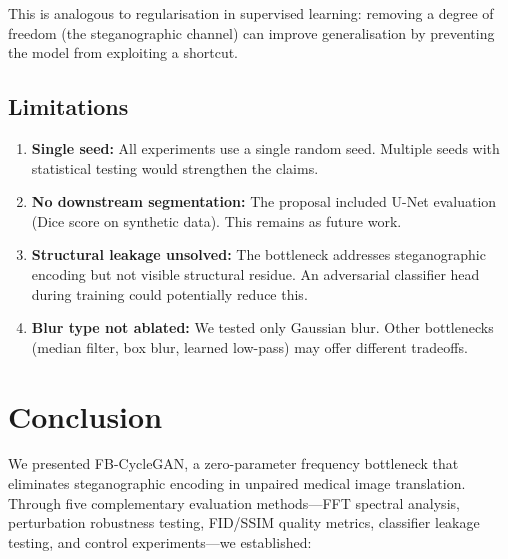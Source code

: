 \documentclass[11pt,a4paper]{article}
\theoremstyle{definition}
\begin{document}
This is analogous to regularisation in supervised learning: removing a degree of freedom (the steganographic channel) can improve generalisation by preventing the model from exploiting a shortcut.

\subsection{Limitations}

\begin{enumerate}
    \item \textbf{Single seed:} All experiments use a single random seed. Multiple seeds with statistical testing would strengthen the claims.
    \item \textbf{No downstream segmentation:} The proposal included U-Net evaluation (Dice score on synthetic data). This remains as future work.
    \item \textbf{Structural leakage unsolved:} The bottleneck addresses steganographic encoding but not visible structural residue. An adversarial classifier head during training could potentially reduce this.
    \item \textbf{Blur type not ablated:} We tested only Gaussian blur. Other bottlenecks (median filter, box blur, learned low-pass) may offer different tradeoffs.
\end{enumerate}

\section{Conclusion}

We presented FB-CycleGAN, a zero-parameter frequency bottleneck that eliminates steganographic encoding in unpaired medical image translation. Through five complementary evaluation methods---FFT spectral analysis, perturbation robustness testing, FID/SSIM quality metrics, classifier leakage testing, and control experiments---we established:
\end{document}
